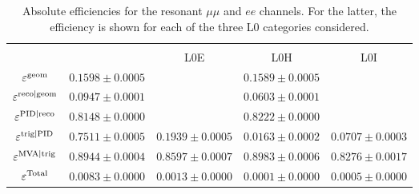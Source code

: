 \begin{table}[h!]
\centering
\caption{Absolute efficiencies for the resonant $\mu\mu$ and $ee$ channels. 
For the latter, the efficiency is shown for each of the three L0 categories considered.}
\renewcommand\arraystretch{1.25}
\begin{tabular}{c|c|c|c|c}
\multirow{2}{*}{\boldmath{$\varepsilon$}} 	&  \boldmath{$\mu\mu$} 	& \multicolumn {3}{c}{\boldmath{$ee$}} \\ \cline{2-5}
	  & &  L0E 	& L0H 	& L0I \\ \hline
$\varepsilon^{\rm geom}$  & $ 0.1598  \pm  0.0005 $ & \multicolumn{3}{c}{$ 0.1589  \pm  0.0005 $} \\
$\varepsilon^{\rm reco|geom}$  & $ 0.0947  \pm  0.0001 $ & \multicolumn{3}{c}{$ 0.0603  \pm  0.0001 $} \\
$\varepsilon^{\rm PID|reco}$  & $ 0.8148  \pm  0.0000 $ & \multicolumn{3}{c}{$ 0.8222  \pm  0.0000 $} \\
\hline
$\varepsilon^{\rm trig|PID}$  & $ 0.7511  \pm  0.0005 $ & $ 0.1939  \pm  0.0005 $ & $ 0.0163  \pm  0.0002 $ & $ 0.0707  \pm  0.0003 $ \\
$\varepsilon^{\rm MVA|trig}$   & $ 0.8944  \pm  0.0004 $ & $ 0.8597  \pm  0.0007 $ & $ 0.8983  \pm  0.0006 $ & $ 0.8276  \pm  0.0017 $ \\
\hline
$\varepsilon^{\rm Total}$   & $ 0.0083  \pm  0.0000 $ & $ 0.0013  \pm  0.0000 $ & $ 0.0001  \pm  0.0000 $ & $ 0.0005  \pm  0.0000 $ \\
\end{tabular}
\label{tab:AbsEff_jpsi}
\end{table}


